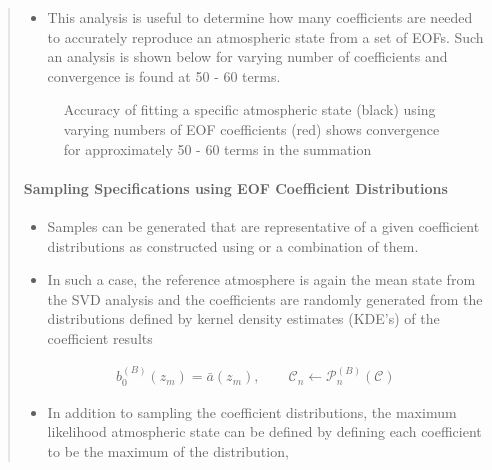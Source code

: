 \documentclass[letterpaper,10pt,english]{sphinxmanual}
\let\sphinxpxdimen\pdfpxdimen\else\newdimen\sphinxpxdimen
\begin{document}
\begin{itemize}
\begin{quote}
\begin{sphinxVerbatim}[commandchars=\\\{\}]
   
\end{sphinxVerbatim}
\begin{itemize}
\item {} 
This analysis is useful to determine how many coefficients are needed to accurately reproduce an atmospheric state from a set of EOFs.  Such an analysis is shown below for varying number of coefficients and convergence is found at 50 - 60 terms.

\end{itemize}

\begin{figure}[htbp]
\centering
\capstart

\noindent\sphinxincludegraphics[width=700\sphinxpxdimen]{{US_NE-fits}.png}
\caption{Accuracy of fitting a specific atmospheric state (black) using varying numbers of EOF coefficients (red) shows convergence for approximately 50 - 60 terms in the summation}\label{\detokenize{sampling:id1}}\end{figure}


\paragraph{Sampling Specifications using EOF Coefficient Distributions}
\label{\detokenize{sampling:sampling-specifications-using-eof-coefficient-distributions}}\begin{itemize}
\item {} 
Samples can be generated that are representative of a given coefficient distributions as constructed using  or a combination of them.

\item {} 
In such a case, the reference atmosphere is again the mean state from the SVD analysis and the coefficients are randomly generated from the distributions defined by kernel density estimates (KDE’s) of the coefficient results

\end{itemize}
\begin{equation*}
\begin{split}b_0^{(B)} \left( z_m \right) = \bar{a}  \left( z_m \right) , \quad \quad \mathcal{C}_n \longleftarrow \mathcal{P}_n^{(B)} \left( \mathcal{C} \right)\end{split}
\end{equation*}\begin{itemize}
\item {} 
In addition to sampling the coefficient distributions, the maximum likelihood atmospheric state can be defined by defining each coefficient to be the maximum of the distribution,


\end{itemize}
\end{quote}
\end{itemize}
\end{document}

